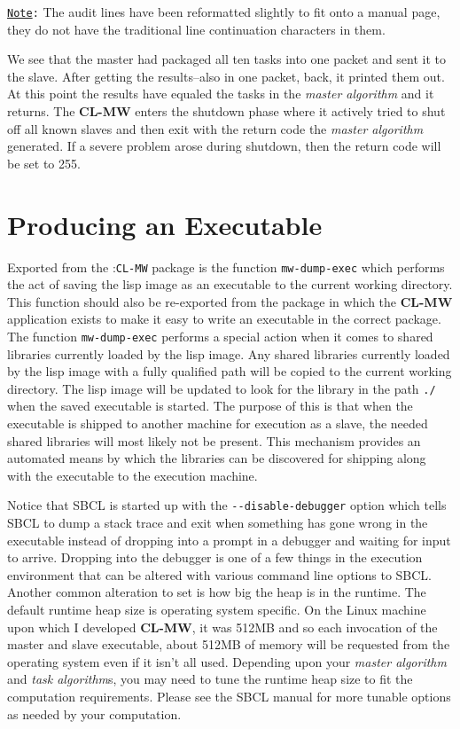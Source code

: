 \documentclass[titlepage,12pt]{book}
\newcommand{\xsmall}{\latexhtml{\small}{}}
\newcommand{\xnormalsize}{\latexhtml{\normalsize}{}}
\newcommand{\sbcl}{SBCL\xspace}
\newcommand{\clmw}{\xsmall\textbf{CL-MW}\xnormalsize\xspace}
\newcommand{\package}[1]{\mbox{:\uppercase{\xsmall\texttt{#1}\xnormalsize}} package\xspace}
\newcommand{\mwpackage}{\package{CL-MW}}
\newcommand{\ma}{\textit{master algorithm}\xspace}
\newcommand{\tas}{\textit{task algorithm}s\xspace}
\newcommand{\dash}{\texttt{-}}
\newcommand{\func}[1]{\xsmall\mbox{\uppercase{\texttt{#1}}}\xnormalsize\xspace}
\newcommand{\file}[1]{\texttt{#1}\xspace}
\newcommand{\Option}[1]{\dash\dash\texttt{#1}}
\newcommand{\Note}{\texttt{\underline{Note}:}\xspace}
\begin{document}
\Note The audit lines have been reformatted slightly to fit onto
a manual page, they do not have the traditional line continuation
characters in them.

We see that the master had packaged all ten tasks into one packet and
sent it to the slave. After getting the results--also in one packet,
back, it printed them out. At this point the results have equaled
the tasks in the \ma and it returns. The \clmw enters the shutdown
phase where it actively tried to shut off all known slaves and then
exit with the return code the \ma generated. If a severe problem
arose during shutdown, then the return code will be set to 255.

\section{Producing an Executable}

Exported from the \mwpackage is the function \func{mw-dump-exec}
which performs the act of saving the lisp image as an executable
to the current working directory. This function should also be
re-exported from the package in which the \clmw application exists
to make it easy to write an executable in the correct package. The
function \func{mw-dump-exec} performs a special action when it comes
to shared libraries currently loaded by the lisp image.  Any shared
libraries currently loaded by the lisp image with a fully qualified
path will be copied to the current working directory. The lisp image
will be updated to look for the library in the path \file{./} when
the saved executable is started. The purpose of this is that when the
executable is shipped to another machine for execution as a slave, the
needed shared libraries will most likely not be present. This mechanism
provides an automated means by which the libraries can be discovered
for shipping along with the executable to the execution machine.

Notice that \sbcl is started up with the \Option{disable-debugger}
option which tells \sbcl to dump a stack trace and exit when something
has gone wrong in the executable instead of dropping into a prompt
in a debugger and waiting for input to arrive.  Dropping into the
debugger is one of a few things in the execution environment that
can be altered with various command line options to \sbcl. Another
common alteration to set is how big the heap is in the runtime.
The default runtime heap size is operating system specific. On the
Linux machine upon which I developed \clmw, it was 512MB and so
each invocation of the master and slave executable, about 512MB of
memory will be requested from the operating system even if it isn't
all used. Depending upon your \ma and \tas, you may need to tune the
runtime heap size to fit the computation requirements. Please see the
\sbcl manual for more tunable options as needed by your computation.
\end{document}
